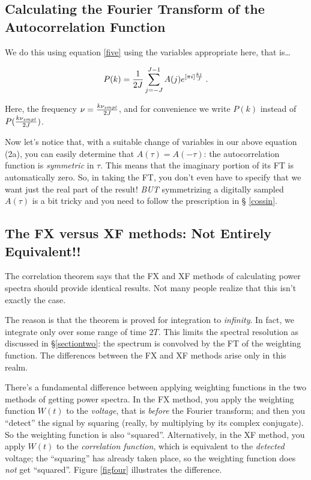 \documentclass[psfig,preprint]{aastex}
\begin{document}
\subsection{Calculating the Fourier Transform of the Autocorrelation
Function}

	We do this using equation \ref{five} using the variables
appropriate here, that is\dots

\begin{equation}
P(k) = {1 \over 2J} \sum_{j=-J}^{J-1} A(j) e^{[\pi i] {kj \over J}} \; .
\end{equation}

\noindent Here, the frequency $\nu = {k \nu_{smpl} \over 2J}$, and for
convenience we write $P(k)$ instead of $P({k \nu_{smpl} \over 2J})$.

        Now let's notice that, with a suitable change of variables in
our above equation (2a), you can easily determine that $A(\tau) =
A(-\tau)$: the autocorrelation function is {\it symmetric} in $\tau$.
This means that the imaginary portion of its FT is automatically zero.
So, in taking the FT, you don't even have to specify that we want just
the real part of the result! {\it BUT} symmetrizing a digitally sampled
$A(\tau)$ is a bit tricky and you need to follow the prescription in \S
\ref{cossin}.

\subsection{The FX versus XF methods: Not Entirely Equivalent!!}

	The correlation theorem says that the FX and XF methods of
calculating power spectra should provide identical results. Not many
people realize that this isn't exactly the case.

	The reason is that the theorem is proved for integration to
{\it infinity}. In fact, we integrate only over some range of time $2T$.
This limits the spectral resolution as discussed in \S \ref{sectiontwo}:
the spectrum is convolved by the FT of the weighting function. The
differences between the FX and XF methods arise only in this realm.

        There's a fundamental difference between applying weighting
functions in the two methods of getting power spectra.  In the FX
method, you apply the weighting function $W(t)$ to the {\it voltage},
that is {\it before} the Fourier transform; and then you ``detect'' the
signal by squaring (really, by multiplying by its complex conjugate). 
So the weighting function is also ``squared''. Alternatively, in the XF
method, you apply $W(t)$ to the {\it correlation function}, which is
equivalent to the {\it detected} voltage; the ``squaring'' has already
taken place, so the weighting function does {\it not} get ``squared''. 
Figure \ref{figfour} illustrates the difference.
\end{document}
